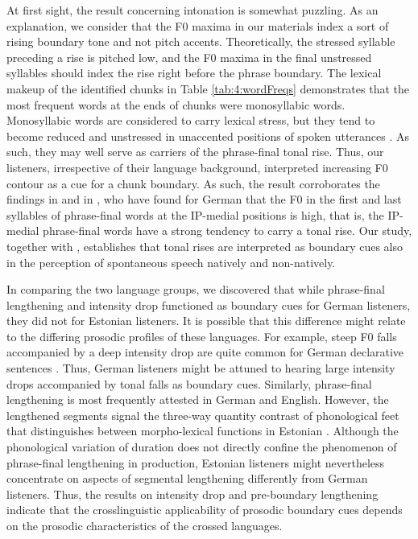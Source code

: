 \documentclass[output=paper]{langscibook}
\begin{document}
    At first sight, the result concerning intonation is somewhat puzzling. As an explanation, we consider that the F0 maxima in our materials index a sort of rising boundary tone and not pitch accents. Theoretically, the stressed syllable preceding a rise is pitched low, and the F0 maxima in the final unstressed syllables should index the rise right before the phrase boundary. The lexical makeup of the identified chunks in Table \ref{tab:4:wordFreqs} demonstrates that the most frequent words at the ends of chunks were monosyllabic words. Monosyllabic words are considered to carry lexical stress, but they tend to become reduced and unstressed in unaccented positions of spoken utterances \citep[][54]{lehiste1960}. As such, they may well serve as carriers of the phrase-final tonal rise. Thus, our listeners, irrespective of their language background, interpreted increasing F0 contour as a cue for a chunk boundary. As such, the result corroborates the findings in \citet[][]{petroneEtAl2017} and in \citet[][]{KentnerFery2013}, who have found for German that the F0 in the first and last syllables of phrase-final words at the IP-medial positions is high, that is, the IP-medial phrase-final words have a strong tendency to carry a tonal rise. Our study, together with \citet[][]{petroneEtAl2017}, establishes that tonal rises are interpreted as boundary cues also in the perception of spontaneous speech natively and non-natively.

    In comparing the two language groups, we discovered that while phrase-final lengthening and intensity drop functioned as boundary cues for German listeners, they did not for Estonian listeners. It is possible that this difference might relate to the differing prosodic profiles of these languages. For example, steep F0 falls accompanied by a deep intensity drop are quite common for German declarative sentences \citep[][]{peters1999, ulbrich2002}. Thus, German listeners might be attuned to hearing large intensity drops accompanied by tonal falls as boundary cues. Similarly, phrase-final lengthening is most frequently attested in German and English. However, the lengthened segments signal the three-way quantity contrast of phonological feet that distinguishes between morpho-lexical functions in Estonian \citep[][]{eek1990, lehiste1960, lehiste1997}. Although the phonological variation of duration does not directly confine the phenomenon of phrase-final lengthening in production, Estonian listeners might nevertheless concentrate on aspects of segmental lengthening differently from German listeners. Thus, the results on intensity drop and pre-boundary lengthening indicate that the crosslinguistic applicability of prosodic boundary cues depends on the prosodic characteristics of the crossed languages.
\end{document}
